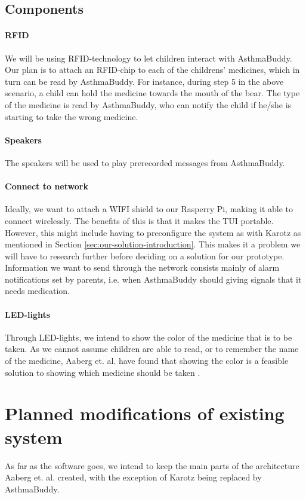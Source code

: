 \subsection{Components}

\paragraph{RFID}
We will be using RFID-technology to let children interact with AsthmaBuddy. Our plan is to attach an RFID-chip to each of the childrens' medicines, which in turn can be read by AsthmaBuddy. For instance, during step 5 in the above scenario, a child can hold the medicine towards the mouth of the bear. The type of the medicine is read by AsthmaBuddy, who can notify the child if he/she is starting to take the wrong medicine. 

\paragraph{Speakers}
The speakers will be used to play prerecorded messages from AsthmaBuddy.

\paragraph{Connect to network}
Ideally, we want to attach a WIFI shield to our Rasperry Pi, making it able to connect wirelessly. The benefits of this is that it makes the TUI portable. However, this might include having to preconfigure the system as with Karotz as mentioned in Section \ref{sec:our-solution-introduction}. This makes it a problem we will have to research further before deciding on a solution for our prototype. Information we want to send through the network consists mainly of alarm notifications set by parents, i.e. when AsthmaBuddy should giving signals that it needs medication. 

\paragraph{LED-lights}
Through LED-lights, we intend to show the color of the medicine that is to be taken. As we cannot assume children are able to read, or to remember the name of the medicine, Aaberg et. al. have found that showing the color is a feasible solution to showing which medicine should be taken \cite{CustomerDriven}. 

\section{Planned modifications of existing system}
As far as the software goes, we intend to keep the main parts of the architecture Aaberg et. al. created, with the exception of Karotz being replaced by AsthmaBuddy. 


